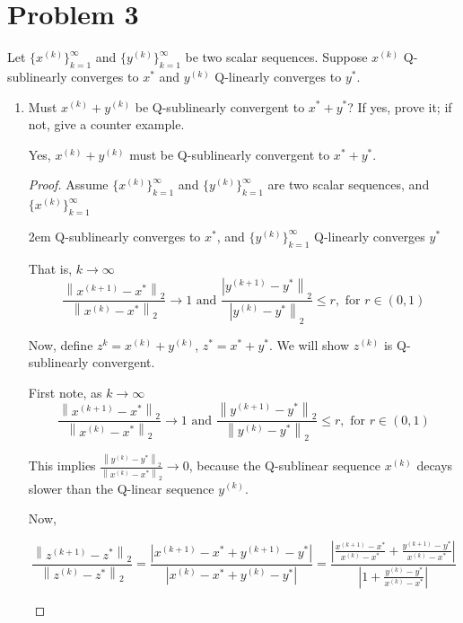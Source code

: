 \documentclass[12pt]{article}
\begin{document}
\newpage

\section*{Problem 3}
Let $\{x^{(k)}\}_{k=1}^\infty$ and $\{y^{(k)}\}_{k=1}^\infty$ be two scalar sequences. Suppose $x^{(k)}$ Q-sublinearly converges to $x^*$ and $y^{(k)}$ Q-linearly converges to $y^*$. 
\begin{enumerate}
\item Must $x^{(k)} + y^{(k)}$ be Q-sublinearly convergent to $x^*+y^*$? If yes, prove it; if not, give a counter example. 

\vspace{8mm}

\noindent Yes, $x^{(k)} + y^{(k)}$ must be Q-sublinearly convergent to $x^* + y^*$.

\vspace{4mm}


\begin{proof}Assume $\{x^{(k)}\}_{k=1}^\infty$ and $\{y^{(k)}\}_{k=1}^\infty$ are two scalar sequences, and $\{x^{(k)}\}_{k=1}^\infty$
\begin{adjustwidth}{2em}{}
\noindent Q-sublinearly converges to $x^*$, and $\{y^{(k)}\}_{k=1}^\infty$ Q-linearly converges $y^*$

\noindent That is, $k \rightarrow \infty$
\[ \frac{\left\|x^{(k + 1)} - x^*\right\|_2}{\left\|x^{(k)} - x^*\right\|_2} \rightarrow 1 \text{ and } \frac{\left|y^{(k + 1)} - y^*\right\|_2}{\left|y^{(k)} - y^*\right\|_2} \leq r, \text{ for } r\in(0,1)\]

\noindent Now, define $z^{k} = x^{(k)} + y^{(k)}$, $z^* = x^* + y^*$. We will show $z^{(k)}$ is Q-sublinearly convergent.

\noindent First note, as $k \rightarrow \infty$
\[ \frac{\left\|x^{(k + 1)} - x^*\right\|_2}{\left\|x^{(k)} - x^*\right\|_2} \rightarrow 1 \text{ and } \frac{\left\|y^{(k + 1)} - y^*\right\|_2}{\left\|y^{(k)} - y^*\right\|_2} \leq r, \text{ for } r\in(0,1)\]

\noindent This implies $\frac{\left\|y^{(k)} - y^*\right\|_2}{\left\|x^{(k)} - x^*\right\|_2}\rightarrow 0$, because the Q-sublinear sequence $x^{(k)}$ decays slower than the Q-linear sequence $y^{(k)}$.


\noindent Now, 

\[ \frac{\left\|z^{(k + 1)} - z^*\right\|_2}{\left\|z^{(k)} - z^*\right\|_2} = \frac{\left|x^{(k + 1)} - x^* + y^{(k + 1)} - y^*\right|}{\left|x^{(k)} - x^* + y^{(k)} - y^*\right|} = \frac{\left|\frac{x^{(k + 1)} - x^*}{x^{(k)} - x^*} + \frac{y^{(k + 1)} - y^*}{x^{(k)} - x^*}\right|}{\left| 1 + \frac{y^{(k)} - y^*}{x^{(k)} - x^*}\right|}\]


\end{adjustwidth}
\end{proof}
\end{enumerate}
\end{document}
